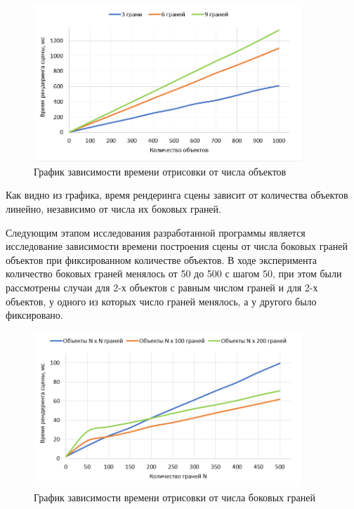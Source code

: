 \begin{figure}[h]
	\centering
	\includegraphics[width=0.9\textwidth]{img/exp/exp1.png}
	\caption{График зависимости времени отрисовки от числа объектов}
	\label{fig:exp-1}
\end{figure}

Как видно из графика, время рендеринга сцены зависит от количества объектов линейно, независимо от числа их боковых граней.

Следующим этапом исследования разработанной программы является исследование зависимости времени построения сцены от числа боковых граней объектов при фиксированном количестве объектов. В ходе эксперимента количество боковых граней менялось от 50 до 500 с шагом 50, при этом были рассмотрены случаи для 2-х объектов с равным числом граней и для 2-х объектов, у одного из которых число граней менялось, а у другого было фиксировано. 

\begin{figure}[h]
	\centering
	\includegraphics[width=0.9\textwidth]{img/exp/exp2.png}
	\caption{График зависимости времени отрисовки от числа боковых граней}
	\label{fig:exp-2}
\end{figure}

